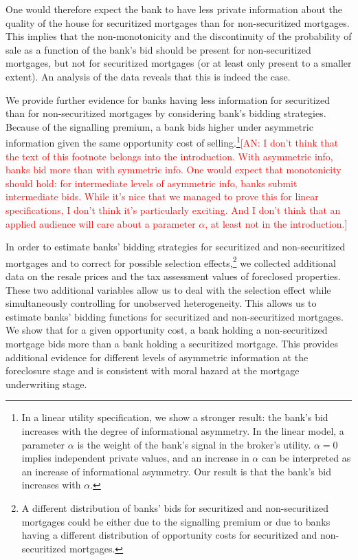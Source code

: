 \documentclass[11pt,twopage]{article}
\newcommand{\AN}[1]{\textcolor{red}{[AN: #1]}}
\begin{document}
One would therefore expect the bank to have less private information
about the quality of the house for securitized mortgages than for
non-securitized mortgages. This implies that the non-monotonicity and
the discontinuity of the probability of sale as a function of the
bank's bid should be present for non-securitized mortgages, but not
for securitized mortgages (or at least only present to a smaller
extent). An analysis of the data reveals that this is indeed the case.

We provide further evidence for banks having less information for securitized than for non-securitized mortgages by
considering bank's bidding strategies. Because of the signalling
premium, a bank bids higher under asymmetric information given the same opportunity cost of selling.\footnote{In a linear utility specification, we
  show a stronger
  result: the bank's bid increases with the degree of informational
  asymmetry. In the linear model, a parameter $\alpha$
  is the weight of the bank's signal in the broker's utility. $\alpha=0$ implies independent private values, and an increase in
  $\alpha$ can be interpreted as an increase of informational
  asymmetry. Our result is that the bank's bid increases with
  $\alpha$.}\AN{I don't think that the text of this footnote belongs into the introduction.
  With asymmetric info, banks bid more than with symmetric info.
  One would expect that monotonicity should hold: for intermediate levels
  of asymmetric info, banks submit intermediate bids. While it's nice
  that we managed to prove this for linear specifications, I don't think
  it's particularly exciting. And I don't think that an applied audience
  will care about a parameter $\alpha$, at least not in the introduction.}
  
  In order to estimate banks' bidding strategies for
securitized and non-securitized mortgages and to correct for possible
selection effects,\footnote{A different distribution of banks' bids
  for securitized and non-securitized mortgages could be either due to
  the signalling premium or due to banks having a different
  distribution of opportunity costs for securitized and
  non-securitized mortgages.} we collected additional data on the
resale prices and the tax assessment values of foreclosed
properties. These two additional variables allow us to deal with the
selection effect while simultaneously controlling for unobserved heterogeneity. This
allows us to estimate banks' bidding functions for securitized and
non-securitized mortgages. We show that for a given opportunity cost,
a bank holding a non-securitized mortgage bids more than a bank
holding a securitized mortgage. This provides additional evidence for
different levels of asymmetric information at the foreclosure stage
and is consistent with moral hazard at the mortgage underwriting stage.
\end{document}
